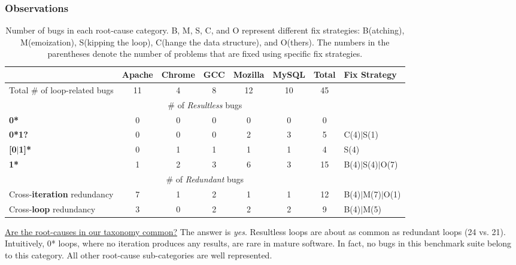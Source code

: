 \subsubsection{Observations}
\label{sec:study_ob}
\begin{table*}[tb!]
\small
\centering
{
\begin{tabular}{|lccccccl|}
\hline
&Apache&Chrome&GCC&Mozilla&MySQL&Total&Fix Strategy\\
\hline
Total \# of loop-related bugs & 11 & 4 & 8 & 12 & 10 & 45 &  \\
\hline
\multicolumn{8}{|c|}{\# of {\textit {Resultless}} bugs}\\
\multicolumn{1}{|l}{ {\bf 0*} }
&0&0&0&0&0&0&\\
\multicolumn{1}{|l}{ {\bf 0*1?} }
&0&0&0&2&3&5&C(4)$|$S(1)\\
\multicolumn{1}{|l}{{\bf [0$|$1]*}}
&0&1&1&1&1&4&S(4)\\
\multicolumn{1}{|l}{{\bf 1*}}
&1&2&3&6&3&15& B(4)$|$S(4)$|$O(7)\\
\hline
\multicolumn{8}{|c|}{ \# of {\textit {Redundant}} bugs}\\
\multicolumn{1}{|l}{Cross-{\bf iteration} redundancy}
&7&1&2&1&1&12&B(4)$|$M(7)$|$O(1)\\
\multicolumn{1}{|l}{ Cross-{\bf loop} redundancy}
&3&0&2&2&2&9&B(4)$|$M(5)\\
\hline
\end{tabular}
}
\caption{Number of bugs in each root-cause category. 
B, M, S, C, and O represent different fix strategies:
B(atching),  
M(emoization), 
S(kipping the loop),
C(hange the data structure), and O(thers). The numbers in the 
parentheses denote the number of problems that are fixed using specific
fix strategies.}
\label{tab:root}
\end{table*}



\underline{Are the root-causes in our taxonomy common?}
The answer is \textit{yes}.
Resultless loops are about as common as redundant loops
(24 vs. 21).
Intuitively, 0* loops, where no iteration produces any results,
are rare in mature software. In fact, no bugs in this
benchmark suite belong to this category.
All other root-cause sub-categories are well represented.


